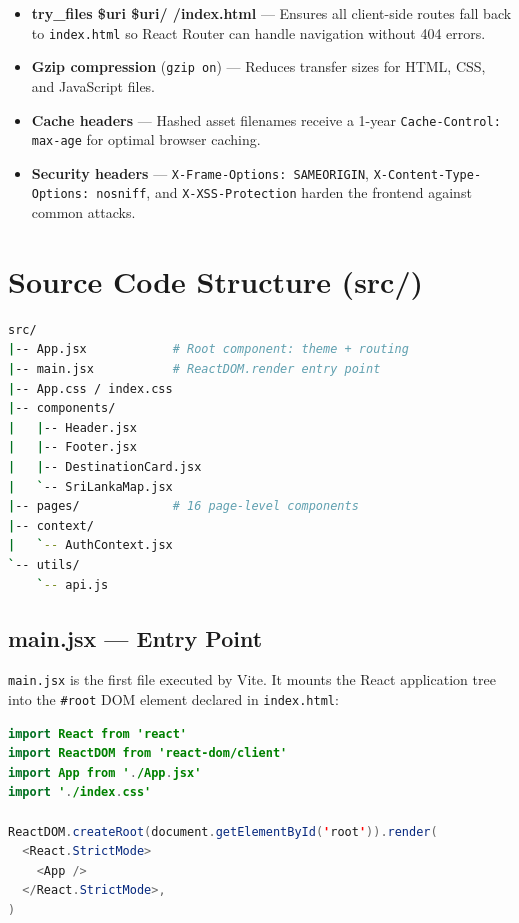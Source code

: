 \documentclass[12pt,a4paper]{report}
\begin{document}
\begin{itemize}[leftmargin=2em]
  \item \textbf{try\_files \$uri \$uri/ /index.html} — Ensures all client-side routes fall back to \texttt{index.html} so React Router can handle navigation without 404 errors.
  \item \textbf{Gzip compression} (\texttt{gzip on}) — Reduces transfer sizes for HTML, CSS, and JavaScript files.
  \item \textbf{Cache headers} — Hashed asset filenames receive a 1-year \texttt{Cache-Control: max-age} for optimal browser caching.
  \item \textbf{Security headers} — \texttt{X-Frame-Options: SAMEORIGIN}, \texttt{X-Content-Type-Options: nosniff}, and \texttt{X-XSS-Protection} harden the frontend against common attacks.
\end{itemize}

\section{Source Code Structure (src/)}

\begin{lstlisting}[language=bash, caption={Frontend source layout}]
src/
|-- App.jsx            # Root component: theme + routing
|-- main.jsx           # ReactDOM.render entry point
|-- App.css / index.css
|-- components/
|   |-- Header.jsx
|   |-- Footer.jsx
|   |-- DestinationCard.jsx
|   `-- SriLankaMap.jsx
|-- pages/             # 16 page-level components
|-- context/
|   `-- AuthContext.jsx
`-- utils/
    `-- api.js
\end{lstlisting}

\subsection{main.jsx --- Entry Point}

\texttt{main.jsx} is the first file executed by Vite. It mounts the React application tree into the \texttt{\#root} DOM element declared in \texttt{index.html}:

\begin{lstlisting}[language=Java, caption={main.jsx}]
import React from 'react'
import ReactDOM from 'react-dom/client'
import App from './App.jsx'
import './index.css'

ReactDOM.createRoot(document.getElementById('root')).render(
  <React.StrictMode>
    <App />
  </React.StrictMode>,
)
\end{lstlisting}
\end{document}
